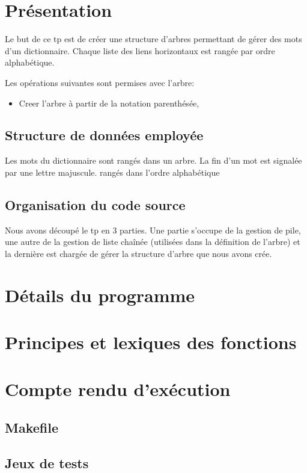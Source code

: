 \documentclass{report}
\begin{document}
  
  \tableofcontents
  \setlength{\parskip}{10pt}
  \setlength{\parindent}{0pt}
  \chapter{Présentation}
    Le but de ce tp est de créer une structure d'arbres permettant de gérer des mots d'un dictionnaire. Chaque liste des liens horizontaux est rangée par ordre alphabétique.

    Les opérations suivantes sont permises avec l'arbre:
    \begin{itemize}
      \item Creer l'arbre à partir de la notation parenthésée,
    \end{itemize}

    \section{Structure de données employée}
      Les mots du dictionnaire sont rangés dans un arbre. La fin d'un mot est signalée par une lettre majuscule. rangés dans l'ordre alphabétique
    \section{Organisation du code source}
      Nous avons découpé le tp en 3 parties. Une partie s'occupe de la gestion de pile, une autre de la gestion de liste chaînée (utilisées dans la définition de l'arbre) et la dernière est chargée de gérer la structure d'arbre que nous avons crée.

      
  \chapter{Détails du programme}
    

  \chapter{Principes et lexiques des fonctions}
    

  \chapter{Compte rendu d'exécution}
    \section{Makefile}

    \section{Jeux de tests}
%      
\end{document}

